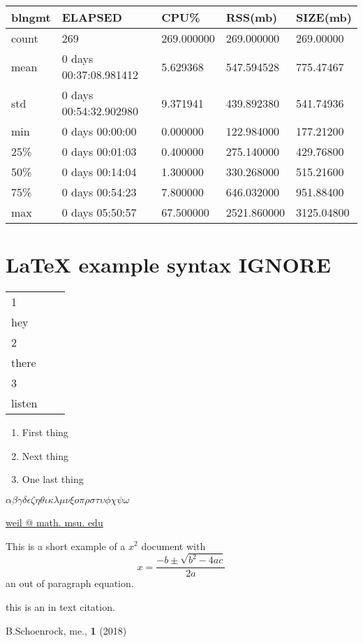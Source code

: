 \documentclass{article}
\begin{document}
\begin{tabular}{|l|l|l|l|l|}
\hline 
\hline blngmt& ELAPSED&   CPU\%&  RSS(mb)&   SIZE(mb) \\
\hline count&    269& 269.000000&  269.000000&  269.00000 \\
\hline mean&  0 days 00:37:08.981412&  5.629368&  547.594528&  775.47467 \\
\hline std&  0 days 00:54:32.902980&  9.371941&  439.892380&  541.74936 \\
\hline min&   0 days 00:00:00&  0.000000&  122.984000&  177.21200 \\
\hline 25\%&   0 days 00:01:03&  0.400000&  275.140000&  429.76800 \\
\hline 50\%&   0 days 00:14:04&  1.300000&  330.268000&  515.21600 \\
\hline 75\%&   0 days 00:54:23&  7.800000&  646.032000&  951.88400 \\
\hline max&   0 days 05:50:57&  67.500000& 2521.860000& 3125.04800 \\
\hline 
\end{tabular}



\section{LaTeX example syntax IGNORE}

\begin{tabular}{|l|c|r|}
\hline 
\hline 1 \\ hey \\
\hline 2 \\ there \\
\hline 3 \\ listen \\
\hline 
\end{tabular}

\begin{enumerate}
\item First thing
\item Next thing
\item One last thing
\end{enumerate}

$\alpha \beta \gamma \delta \epsilon \zeta \eta \theta \iota \kappa \lambda \mu \nu \xi o \pi \rho \sigma \tau \upsilon \phi \chi \psi \omega$

\url{weil @ math. msu. edu}

This is a short example of a $x^{2}$ document with $$x=\frac{-b\pm\sqrt{b^{2}-4ac}}{2a}$$ an out of paragraph equation.

this is an in text citation. \cite{thingy}


\begin{thebibliography}{9}
 B.Schoenrock, me., \textbf{1} (2018)
\end{thebibliography}
\end{document}
